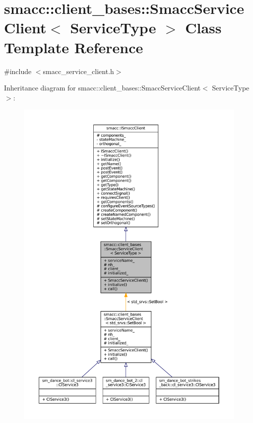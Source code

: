 \hypertarget{classsmacc_1_1client__bases_1_1SmaccServiceClient}{}\section{smacc\+:\+:client\+\_\+bases\+:\+:Smacc\+Service\+Client$<$ Service\+Type $>$ Class Template Reference}
\label{classsmacc_1_1client__bases_1_1SmaccServiceClient}


{\ttfamily \#include $<$smacc\+\_\+service\+\_\+client.\+h$>$}



Inheritance diagram for smacc\+:\+:client\+\_\+bases\+:\+:Smacc\+Service\+Client$<$ Service\+Type $>$\+:
\nopagebreak
\begin{figure}[H]
\begin{center}
\leavevmode
\includegraphics[width=350pt]{classsmacc_1_1client__bases_1_1SmaccServiceClient__inherit__graph}
\end{center}
\end{figure}


